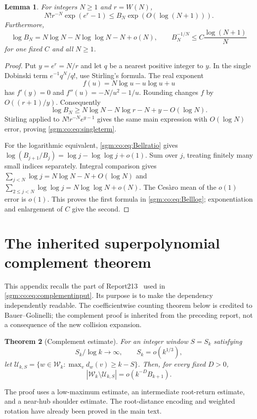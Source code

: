 \documentclass[11pt,letterpaper]{article}
\newtheorem{theorem}{Theorem}[section]
\newtheorem{lemma}[theorem]{Lemma}\newtheorem{proposition}[theorem]{Proposition}\newtheorem{corollary}[theorem]{Corollary}
\theoremstyle{remark}\newtheorem{remark}[theorem]{Remark}
\newcommand{\Wc}{\mathcal W}\newcommand{\Uc}{\mathcal U}\newcommand{\Part}{\operatorname{Part}}
\theoremstyle{definition}\newtheorem{definition}[theorem]{Definition}
\begin{document}
\begin{lemma}\label{sgm:co:lem:singlesaddle}
For integers $N\ge1$ and $r=W(N)$,
\begin{equation}\label{sgm:co:eq:singleterm}
 N!r^{-N}\exp(e^r-1)\le B_N\exp(O(\log(N+1))).
\end{equation}
Furthermore,
\begin{equation}\label{sgm:co:eq:Belllog}
 \log B_N=N\log N-N\log\log N-N+o(N),\qquad
 B_N^{-1/N}\le C\frac{\log(N+1)}N
\end{equation}
for one fixed $C$ and all $N\ge1$.
\end{lemma}
\begin{proof}
Put $y=e^r=N/r$ and let $q$ be a nearest positive integer to $y$. In the single Dobinski term $e^{-1}q^N/q!$, use Stirling's formula. The real exponent
\[
 f(u)=N\log u-u\log u+u
\]
has $f'(y)=0$ and $f''(u)=-N/u^2-1/u$. Rounding changes $f$ by $O((r+1)/y)$. Consequently
\[
 \log B_N\ge N\log N-N\log r-N+y-O(\log N).
\]
Stirling applied to $N!r^{-N}e^{y-1}$ gives the same main expression with $O(\log N)$ error, proving \eqref{sgm:co:eq:singleterm}.

For the logarithmic equivalent, \eqref{sgm:co:eq:Bellratio} gives
$\log(B_{j+1}/B_j)=\log j-\log\log j+o(1)$. Sum over $j$, treating finitely many small indices separately. Integral comparison gives
$\sum_{j<N}\log j=N\log N-N+O(\log N)$ and
$\sum_{2\le j<N}\log\log j=N\log\log N+o(N)$. The Ces\`aro mean of the $o(1)$ error is $o(1)$. This proves the first formula in \eqref{sgm:co:eq:Belllog}; exponentiation and enlargement of $C$ give the second.
\end{proof}


\section{The inherited superpolynomial complement theorem}\label{sgm:co:sec:complement}
This appendix recalls the part of Report213~\cite{r213} used in \eqref{sgm:co:eq:complementinput}. Its purpose is to make the dependency independently readable. The coefficientwise counting theorem below is credited to Bauer--Golinelli; the complement proof is inherited from the preceding report, not a consequence of the new collision expansion.

\begin{theorem}[Complement estimate]\label{sgm:co:thm:complement}
For an integer window $S=S_k$ satisfying
\begin{equation}\label{sgm:co:eq:window}
 S_k/\log k\longrightarrow\infty,\qquad S_k=o(k^{1/3}),
\end{equation}
let $\Uc_{k,S}=\{w\in\Wc_k:\max_vd_w(v)\ge k-S\}$. Then, for every fixed $D>0$,
\[
 |\Wc_k\setminus\Uc_{k,S}|=o(k^{-D}B_{k+1}).
\]
\end{theorem}
The proof uses a low-maximum estimate, an intermediate root-return estimate, and a near-hub shoulder estimate. The root-distance encoding and weighted rotation have already been proved in the main text.
\end{document}

